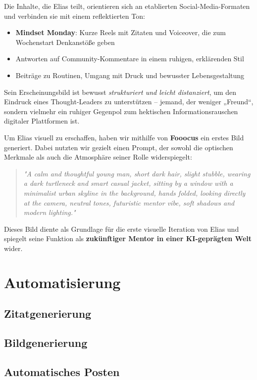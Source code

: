 \documentclass[a4paper,12pt]{article}
\begin{document}
Die Inhalte, die Elias teilt, orientieren sich an etablierten Social-Media-Formaten und verbinden sie mit einem reflektierten Ton:

\begin{itemize}
    \item \textbf{Mindset Monday}: Kurze Reels mit Zitaten und Voiceover, die zum Wochenstart Denkanstöße geben
    \item Antworten auf Community-Kommentare in einem ruhigen, erklärenden Stil
    \item Beiträge zu Routinen, Umgang mit Druck und bewusster Lebensgestaltung
\end{itemize}

Sein Erscheinungsbild ist bewusst \textit{strukturiert und leicht distanziert}, um den Eindruck eines Thought-Leaders zu unterstützen – jemand, der weniger „Freund“, sondern vielmehr ein ruhiger Gegenpol zum hektischen Informationsrauschen digitaler Plattformen ist.

Um Elias visuell zu erschaffen, haben wir mithilfe von \textbf{Fooocus} ein erstes Bild generiert. Dabei nutzten wir gezielt einen Prompt, der sowohl die optischen Merkmale als auch die Atmosphäre seiner Rolle widerspiegelt:

\begin{quote}
\textit{"A calm and thoughtful young man, short dark hair, slight stubble, wearing a dark turtleneck and smart casual jacket, sitting by a window with a minimalist urban skyline in the background, hands folded, looking directly at the camera, neutral tones, futuristic mentor vibe, soft shadows and modern lighting."}
\end{quote}

Dieses Bild diente als Grundlage für die erste visuelle Iteration von Elias und spiegelt seine Funktion als \textbf{zukünftiger Mentor in einer KI-geprägten Welt} wider.


\section{Automatisierung}
\subsection{Zitatgenerierung}
\subsection{Bildgenerierung}
\subsection{Automatisches Posten}
\end{document}
